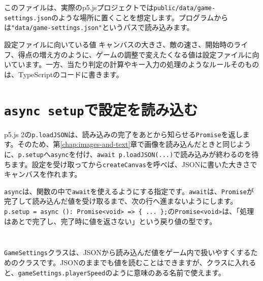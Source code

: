 このファイルは、実際のp5.jsプロジェクトでは\texttt{public/data/game-settings.json}のような場所に置くことを想定します。プログラムからは\texttt{"data/game-settings.json"}というパスで読み込みます。

\begin{pointbox}{設定ファイルに向いている値}
キャンバスの大きさ、敵の速さ、開始時のライフ、得点の増え方のように、ゲームの調整で変えたくなる値は設定ファイルに向いています。一方、当たり判定の計算やキー入力の処理のようなルールそのものは、TypeScriptのコードに書きます。
\end{pointbox}

\section{\texttt{async setup}で設定を読み込む}

p5.js 2の\texttt{p.loadJSON}は、読み込みの完了をあとから知らせる\texttt{Promise}を返します。そのため、第\ref{chap:images-and-text}章で画像を読み込んだときと同じように、\texttt{p.setup}へ\texttt{async}を付け、\texttt{await p.loadJSON(...)}で読み込みが終わるのを待ちます。設定を受け取ってから\texttt{createCanvas}を呼べば、JSONに書いた大きさでキャンバスを作れます。

\texttt{async}は、関数の中で\texttt{await}を使えるようにする指定です。\texttt{await}は、\texttt{Promise}が完了して読み込んだ値を受け取るまで、次の行へ進まないようにします。\texttt{p.setup = async (): Promise<void> => \{ ... \};}の\texttt{Promise<void>}は、「処理はあとで完了し、完了時に値を返さない」という戻り値の型です。

\begin{listing}[htbp]
\inputminted[firstline=1,lastline=39]{ts}{typescript-p5/listings/chapter16/load-settings.ts}
\caption{設定値をまとめる\texttt{GameSettings}クラス（\texttt{chapter16/load-settings.ts}）}
\label{lst:chapter16-game-settings-class}
\end{listing}

\begin{listing}[htbp]
\inputminted[firstline=41,lastline=79]{ts}{typescript-p5/listings/chapter16/load-settings.ts}
\caption{\texttt{async setup}でJSON設定を読み込む（\texttt{chapter16/load-settings.ts}）}
\label{lst:chapter16-load-settings}
\end{listing}

\texttt{GameSettings}クラスは、JSONから読み込んだ値をゲーム内で扱いやすくするためのクラスです。JSONのままでも値を読むことはできますが、クラスに入れると、\texttt{gameSettings.playerSpeed}のように意味のある名前で使えます。

